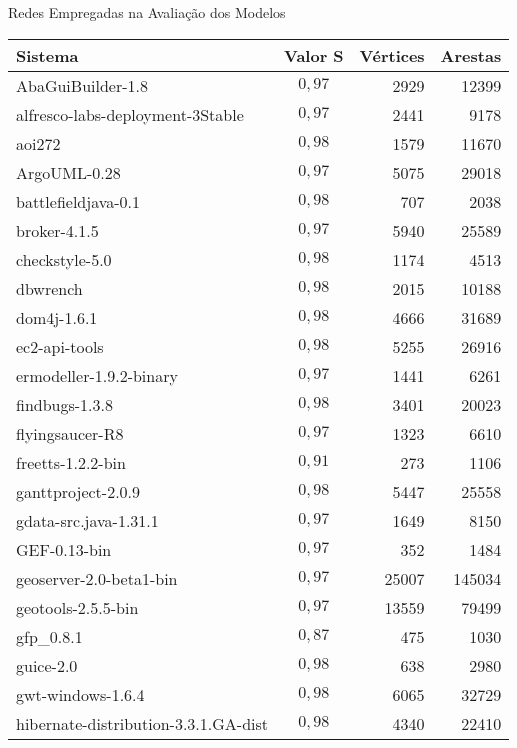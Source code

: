 \begin{chapter}{Redes Empregadas na Avaliação dos Modelos} \label{cap:lista-redes}
%
\begin{center}
\begin{longtable}{| p{10cm} | c | r | r |}
	\hline
	\textbf{Sistema} & \textbf{Valor} S & \textbf{Vértices} & \textbf{Arestas} \\ \hline
	\hline
	AbaGuiBuilder-1.8 &  $0,97$ & 2929 & 12399 \\ \hline
	alfresco-labs-deployment-3Stable &  $0,97$ & 2441 & 9178 \\ \hline
	aoi272 &  $0,98$ & 1579 & 11670 \\ \hline
	ArgoUML-0.28 &  $0,97$ & 5075 & 29018 \\ \hline
	battlefieldjava-0.1 &  $0,98$ & 707 & 2038 \\ \hline
	broker-4.1.5 &  $0,97$ & 5940 & 25589 \\ \hline
	checkstyle-5.0 &  $0,98$ & 1174 & 4513 \\ \hline
	dbwrench &  $0,98$ & 2015 & 10188 \\ \hline
	dom4j-1.6.1 &  $0,98$ & 4666 & 31689 \\ \hline
	ec2-api-tools &  $0,98$ & 5255 & 26916 \\ \hline
	ermodeller-1.9.2-binary &  $0,97$ & 1441 & 6261 \\ \hline
	findbugs-1.3.8 &  $0,98$ & 3401 & 20023 \\ \hline
	flyingsaucer-R8 &  $0,97$ & 1323 & 6610 \\ \hline
	freetts-1.2.2-bin &  $0,91$ & 273 & 1106 \\ \hline
	ganttproject-2.0.9 &  $0,98$ & 5447 & 25558 \\ \hline
	gdata-src.java-1.31.1 &  $0,97$ & 1649 & 8150 \\ \hline
	GEF-0.13-bin &  $0,97$ & 352 & 1484 \\ \hline
	geoserver-2.0-beta1-bin &  $0,97$ & 25007 & 145034 \\ \hline
	geotools-2.5.5-bin &  $0,97$ & 13559 & 79499 \\ \hline
	gfp\_0.8.1 &  $0,87$ & 475 & 1030 \\ \hline
	guice-2.0 &  $0,98$ & 638 & 2980 \\ \hline
	gwt-windows-1.6.4 &  $0,98$ & 6065 & 32729 \\ \hline
	hibernate-distribution-3.3.1.GA-dist &  $0,98$ & 4340 & 22410 \\ \hline

\end{longtable}
\end{center}
\end{chapter}
